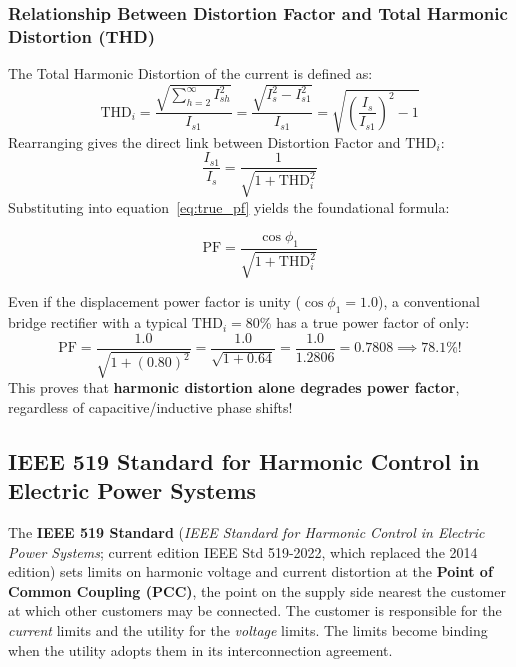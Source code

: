 \documentclass[11pt,a4paper]{article}
\let\origsubsection\subsection
\renewcommand{\subsection}{\Needspace{7\baselineskip}\origsubsection}
\begin{document}
\subsubsection{Relationship Between Distortion Factor and Total Harmonic Distortion (THD)}
The Total Harmonic Distortion of the current is defined as:
\begin{equation}
\text{THD}_i = \frac{\sqrt{\sum_{h=2}^\infty I_{sh}^2}}{I_{s1}} = \frac{\sqrt{I_s^2 - I_{s1}^2}}{I_{s1}} = \sqrt{\left(\frac{I_s}{I_{s1}}\right)^2 - 1}
\end{equation}
Rearranging gives the direct link between Distortion Factor and $\text{THD}_i$:
\begin{equation}
\frac{I_{s1}}{I_s} = \frac{1}{\sqrt{1 + \text{THD}_i^2}}
\end{equation}
Substituting into equation~\eqref{eq:true_pf} yields the foundational formula:
\begin{formulabox}
\begin{equation}
\text{PF} = \frac{\cos\phi_1}{\sqrt{1 + \text{THD}_i^2}}
\label{eq:pf_from_thd}
\end{equation}
\end{formulabox}
\begin{conceptbox}
Even if the displacement power factor is unity ($\cos\phi_1 = 1.0$), a conventional bridge rectifier with a typical $\text{THD}_i = 80\%$ has a true power factor of only:
\begin{equation}
\text{PF} = \frac{1.0}{\sqrt{1 + (0.80)^2}} = \frac{1.0}{\sqrt{1 + 0.64}} = \frac{1.0}{1.2806} = 0.7808 \implies 78.1\%!
\end{equation}
This proves that \textbf{harmonic distortion alone degrades power factor}, regardless of capacitive/inductive phase shifts!
\end{conceptbox}

\subsection{IEEE 519 Standard for Harmonic Control in Electric Power Systems}

The \textbf{IEEE 519 Standard} (\emph{IEEE Standard for Harmonic Control in Electric Power Systems}; current edition IEEE Std 519-2022, which replaced the 2014 edition) sets limits on harmonic voltage and current distortion at the \textbf{Point of Common Coupling (PCC)}, the point on the supply side nearest the customer at which other customers may be connected. The customer is responsible for the \emph{current} limits and the utility for the \emph{voltage} limits. The limits become binding when the utility adopts them in its interconnection agreement.
\end{document}

